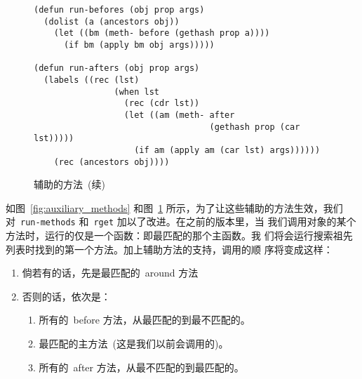 \begin{figure}
\begin{lstlisting}
(defun run-befores (obj prop args)
  (dolist (a (ancestors obj))
    (let ((bm (meth- before (gethash prop a))))
      (if bm (apply bm obj args)))))

(defun run-afters (obj prop args)
  (labels ((rec (lst)
                (when lst
                  (rec (cdr lst))
                  (let ((am (meth- after
                                   (gethash prop (car lst)))))
                    (if am (apply am (car lst) args))))))
    (rec (ancestors obj))))
\end{lstlisting}
\caption{\label{fig:auxiliary_methods_cont}辅助的方法~(续)}
\end{figure}
如图~\ref{fig:auxiliary_methods} 和图~\ref{fig:auxiliary_methods_cont}
所示，为了让这些辅助的方法生效，我们
对~\verb|run-methods| 和~\verb|rget| 加以了改进。在之前的版本里，当
我们调用对象的某个方法时，运行的仅是一个函数：即最匹配的那个主函数。我
们将会运行搜索祖先列表时找到的第一个方法。加上辅助方法的支持，调用的顺
序将变成这样：
\begin{enumerate}
  \item 倘若有的话，先是最匹配的~around 方法
  \item 否则的话，依次是：
  \begin{enumerate}
    \item 所有的~before 方法，从最匹配的到最不匹配的。
    \item 最匹配的主方法~(这是我们以前会调用的)。
    \item 所有的~after 方法，从最不匹配的到最匹配的。
  \end{enumerate}
\end{enumerate}


